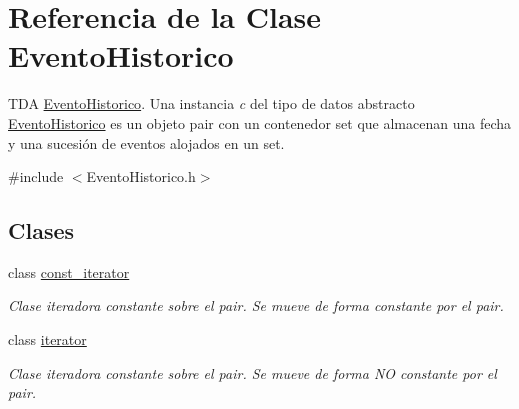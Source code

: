 \hypertarget{classEventoHistorico}{}\section{Referencia de la Clase Evento\+Historico}
\label{classEventoHistorico}


T\+DA \hyperlink{classEventoHistorico}{Evento\+Historico}. Una instancia {\itshape c} del tipo de datos abstracto {\ttfamily \hyperlink{classEventoHistorico}{Evento\+Historico}} es un objeto pair con un contenedor set que almacenan una fecha y una sucesión de eventos alojados en un set.  




{\ttfamily \#include $<$Evento\+Historico.\+h$>$}

\subsection*{Clases}
\begin{DoxyCompactItemize}
\item 
class \hyperlink{classEventoHistorico_1_1const__iterator}{const\+\_\+iterator}
\begin{DoxyCompactList}\small\item\em Clase iteradora constante sobre el pair. Se mueve de forma constante por el pair. \end{DoxyCompactList}\item 
class \hyperlink{classEventoHistorico_1_1iterator}{iterator}
\begin{DoxyCompactList}\small\item\em Clase iteradora constante sobre el pair. Se mueve de forma NO constante por el pair. \end{DoxyCompactList}\end{DoxyCompactItemize}
